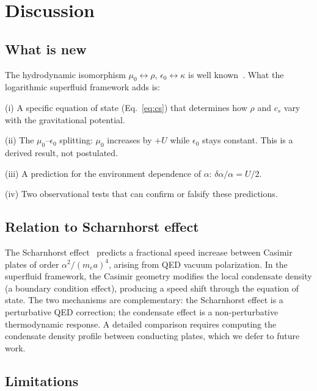 \documentclass[12pt, a4paper]{article}
\begin{document}
\newpage
\section{Discussion}
\label{sec:discussion}

\subsection{What is new}

The hydrodynamic isomorphism $\mu_0 \leftrightarrow
\rho$, $\epsilon_0 \leftrightarrow \kappa$ is well
known~\cite{landau_fluid,jackson_1999}. What the
logarithmic superfluid framework adds is:

(i) A specific equation of state (Eq.~\ref{eq:cs})
that determines how $\rho$ and $c_s$ vary with the
gravitational potential.

(ii) The $\mu_0$--$\epsilon_0$ splitting: $\mu_0$
increases by $+U$ while $\epsilon_0$ stays constant.
This is a derived result, not postulated.

(iii) A prediction for the environment dependence of
$\alpha$: $\delta\alpha/\alpha = U/2$.

(iv) Two observational tests that can confirm or
falsify these predictions.

\subsection{Relation to Scharnhorst effect}

The Scharnhorst effect~\cite{scharnhorst_1990}
predicts a fractional speed increase between Casimir
plates of order $\alpha^2/(m_e a)^4$, arising from
QED vacuum polarization. In the superfluid framework,
the Casimir geometry modifies the local condensate
density (a boundary condition effect), producing a
speed shift through the equation of state. The two
mechanisms are complementary: the Scharnhorst effect
is a perturbative QED correction; the condensate
effect is a non-perturbative thermodynamic response.
A detailed comparison requires computing the
condensate density profile between conducting plates,
which we defer to future work.

\subsection{Limitations}
\end{document}
